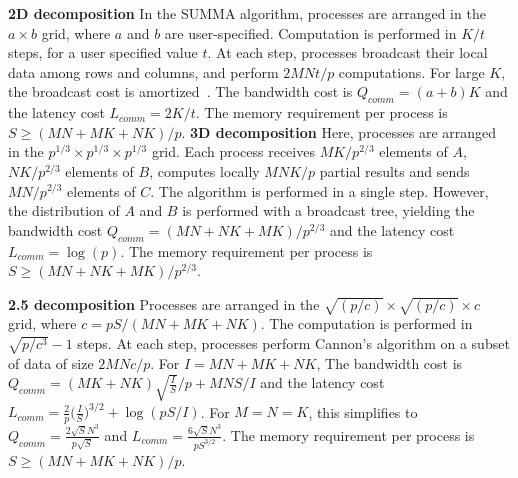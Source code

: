 \documentclass[sigplan,review,anonymous]{acmart}\settopmatter{printfolios=true,printccs=false,printacmref=false}
\newcommand\mac[1]{\textcolor{red}{[Mac: #1]}}
\newcommand{\macb}[1]{\textbf{\textsf{#1}}}
\begin{document}
\macb{2D decomposition}
%
In the SUMMA algorithm, processes are arranged in the  $a \times b$ grid, where 
$a$ and $b$ are user-specified. Computation is performed in $K/t$ steps, for a 
user specified value $t$.  At each step,
processes broadcast their local data among rows and columns, and perform 
$2MNt/p$ computations. For large $K$, the broadcast cost is
amortized~\cite{summa}. The bandwidth cost is $Q_{comm} = (a+b)K$ and the 
latency cost $L_{comm} = 2K/t$. The
memory requirement per process is $S \ge (MN + MK + NK)/p$. 
%
%
%
%
\macb{3D decomposition}
%
Here, processes are arranged in the $p^{1/3} \times
p^{1/3} \times p^{1/3}$ grid.  Each process receives $MK/p^{2/3}$ elements of 
$A$, $NK/p^{2/3}$ elements of $B$,  computes locally
$MNK/p$ partial results and sends $MN/p^{2/3}$
elements of $C$. The algorithm is performed in a single step.
However, the distribution of $A$ and $B$ is performed with a broadcast tree, 
yielding the bandwidth cost $Q_{comm} = (MN + NK+MK)/p^{2/3}$ and the latency 
cost
$L_{comm} = \log (p)$.  The memory requirement per process is $S \ge (MN +
NK+MK)/p^{2/3}$. 

\macb{2.5 decomposition} Processes are arranged in the $\sqrt{(p/c)} \times
\sqrt{(p/c)} \times c$ grid, where $c = pS/(MN + MK + NK)$. The computation is
performed in $\sqrt{p/c^3} - 1$ steps. At each step, processes perform
Cannon's algorithm on a subset of data of size $2MNc/p$. For $I= MN + MK +
NK$, The bandwidth cost is $Q_{comm} = (MK + NK)\sqrt{\frac{I}{S}}/p + MNS/I$
and the latency cost $L_{comm} = \frac{2}{p}\big(\frac{I}{S}\big)^{3/2} +
\log(pS/I)$. For $M=N=K$, this simplifies to $Q_{comm}=
\frac{2\sqrt{S}N^3}{p\sqrt{S}}$ and $L_{comm} =
\frac{6\sqrt{S}N^3}{pS^{3/2}}$. The memory requirement per process is $S \ge
(MN + MK + NK)/p$. 
\end{document}
